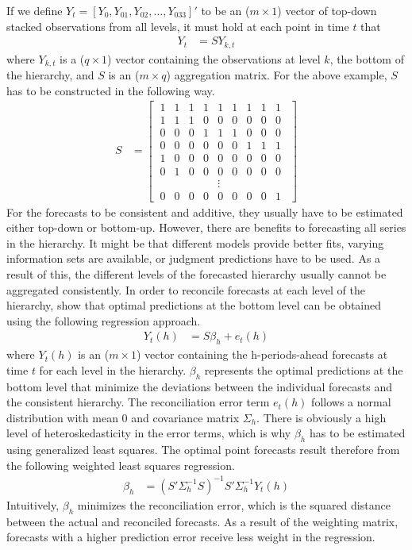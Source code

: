 \documentclass[a4paper,fleqn,11pt]{article}
\begin{document}
If we define $Y_t = [Y_0, Y_{01}, Y_{02}, \hdots, Y_{033}]'$ to be an ($m \times 1$) vector of top-down stacked observations from all levels, it must hold at each point in time $t$ that
\begin{align}
Y_t &= S Y_{k,t}
\end{align}
where $Y_{k,t}$ is a ($q \times 1$) vector containing the observations at level $k$, the bottom of the hierarchy, and $S$ is an ($m \times q$) aggregation matrix. For the above example, $S$ has to be constructed in the following way.
\begin{align*} S &=
\begin{bmatrix}
\ 1 & 1 & 1 & 1 & 1 & 1 & 1 & 1 & 1\ \ \\
\ 1 & 1 & 1 & 0 & 0 & 0 & 0 & 0 & 0\ \ \\
\ 0 & 0 & 0 & 1 & 1 & 1 & 0 & 0 & 0\ \ \\
\ 0 & 0 & 0 & 0 & 0 & 0 & 1 & 1 & 1\ \ \\
\ 1 & 0 & 0 & 0 & 0 & 0 & 0 & 0 & 0\ \ \\
\ 0 & 1 & 0 & 0 & 0 & 0 & 0 & 0 & 0\ \ \\
  &   &   &   & \vdots &   &   &   &   \\
\ 0 & 0 & 0 & 0 & 0 & 0 & 0 & 0 & 1\ \ 
\end{bmatrix}
\end{align*}
For the forecasts to be consistent and additive, they usually have to be estimated either top-down or bottom-up. However, there are benefits to forecasting all series in the hierarchy. It might be that different models provide better fits, varying information sets are available, or judgment predictions have to be used. As a result of this, the different levels of the forecasted hierarchy usually cannot be aggregated consistently. In order to reconcile forecasts at each level of the hierarchy, \cite{Hyndman2011} show that optimal predictions at the bottom level can be obtained using the following regression approach.
\begin{align}
Y_t(h) &= S\beta_{h} + e_t(h)
\end{align}
where $Y_t(h)$ is an ($m \times 1$) vector containing the h-periods-ahead forecasts at time $t$ for each level in the hierarchy. $\beta_{h}$ represents the optimal predictions at the bottom level that minimize the deviations between the individual forecasts and the consistent hierarchy. The reconciliation error term $e_t(h)$ follows a normal distribution with mean 0 and covariance matrix $\Sigma_h$. There is obviously a high level of heteroskedasticity in the error terms, which is why $\beta_h$ has to be estimated using generalized least squares. The optimal point forecasts result therefore from the following weighted least squares regression.
\begin{align}
\label{eq:reg}
\beta_{h} &= \left(S'\Sigma_h^{-1}S \right)^{-1} S'\Sigma_h^{-1}Y_t(h)
\end{align}
Intuitively, $\beta_h$ minimizes the reconciliation error, which is the squared distance between the actual and reconciled forecasts. As a result of the weighting matrix, forecasts with a higher prediction error receive less weight in the regression.\\
\end{document}
